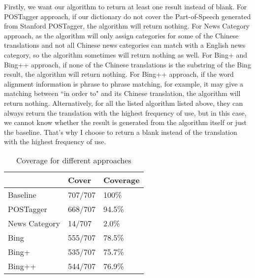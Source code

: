 Firstly, we want our algorithm to return at least one result instead of blank. For POSTagger approach, if our dictionary do not cover the Part-of-Speech generated from Stanford POSTagger, the algorithm will return nothing. For News Category approach, as the algorithm will only assign categories for some of the Chinese translations and not all Chinese news categories can match with a English news category, so the algorithm sometimes will return nothing as well. For Bing+ and Bing++ approach, if none of the Chinese translations is the substring of the Bing result, the algorithm will return nothing. For Bing++ approach, if the word alignment information is phrase to phrase matching, for example, it may give a matching between ``in order to" and its Chinese translation, the algorithm will return nothing. Alternatively, for all the listed algorithm listed above, they can always return the translation with the highest frequency of use, but in this case, we cannot know whether the result is generated from the algorithm itself or just the baseline. That's why I choose to return a blank instead of the translation with the highest frequency of use.

\begin{table}[ht]
  \caption{Coverage for different approaches}
  \label{table:evaluation_1}
  \begin{tabular}{| p{2cm} | p{2cm} | p{2cm} |}
    \hline
     & Cover & Coverage\\
    \hline
    Baseline & 707/707 & 100\%\\
    \hline
    POSTagger & 668/707 & 94.5\%\\
    \hline
    News Category & 14/707 & 2.0\%\\
    \hline
    Bing & 555/707 & 78.5\%\\
    \hline
    Bing+ & 535/707 & 75.7\%\\
    \hline
    Bing++ & 544/707 & 76.9\%\\
    \hline
  \end{tabular}
\end{table}

